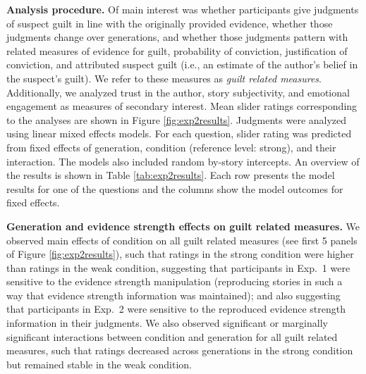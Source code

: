 \documentclass[10pt,letterpaper]{article}
\begin{document}
\textbf{Analysis procedure.} Of main interest was whether participants give judgments of suspect guilt in line with the originally provided evidence, whether those judgments change over generations, and whether those judgments pattern with related measures of evidence for guilt, probability of conviction, justification of conviction, and attributed suspect guilt (i.e., an estimate of the author's belief in the suspect's guilt). We refer to these measures as \emph{guilt related measures}. Additionally, we analyzed trust in the author, story subjectivity, and emotional engagement as measures of secondary interest. Mean slider ratings corresponding to the analyses are shown in Figure \ref{fig:exp2results}.  Judgments were analyzed using linear mixed effects models. For each question, slider rating was predicted from fixed effects of generation, condition (reference level: strong), and their interaction. The models also included random by-story intercepts. An overview of the results is shown in Table \ref{tab:exp2results}. Each row presents the model results for one of the questions and the columns show the model outcomes for fixed effects. 


\textbf{Generation and evidence strength effects on guilt related measures.} We observed  main effects of condition on all guilt related measures (see first 5 panels of Figure \ref{fig:exp2results}), such that ratings in the strong condition were higher than ratings in the weak condition, suggesting that participants in Exp.~1 were sensitive to the evidence strength manipulation (reproducing stories in such a way that evidence strength information was maintained); and also suggesting that participants in Exp.~2 were sensitive to the reproduced evidence strength information in their judgments. %
We also observed significant or marginally significant interactions between condition and generation for all guilt related measures, such that ratings decreased across generations in the strong condition but remained stable in the weak condition. 
\end{document}
